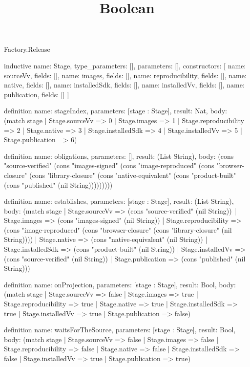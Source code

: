 \begin{lexlean}{Factory.Release}
\title{Boolean}
\begin{semanticmodule}
inductive{
  name: Stage,
  type_parameters: [],
  parameters: [],
  constructors: [
    {name: sourceVv, fields: []},
    {name: images, fields: []},
    {name: reproducibility, fields: []},
    {name: native, fields: []},
    {name: installedSdk, fields: []},
    {name: installedVv, fields: []},
    {name: publication, fields: []}
  ]
}

definition{
  name: stageIndex,
  parameters: [stage : Stage],
  result: Nat,
  body: (match stage
    | Stage.sourceVv => 0
    | Stage.images => 1
    | Stage.reproducibility => 2
    | Stage.native => 3
    | Stage.installedSdk => 4
    | Stage.installedVv => 5
    | Stage.publication => 6)
}

definition{
  name: obligations,
  parameters: [],
  result: (List String),
  body: (cons "source-verified" (cons "images-signed" (cons "image-reproduced" (cons "browser-closure" (cons "library-closure" (cons "native-equivalent" (cons "product-built" (cons "published" (nil String)))))))))
}

definition{
  name: establishes,
  parameters: [stage : Stage],
  result: (List String),
  body: (match stage
    | Stage.sourceVv => (cons "source-verified" (nil String))
    | Stage.images => (cons "images-signed" (nil String))
    | Stage.reproducibility => (cons "image-reproduced" (cons "browser-closure" (cons "library-closure" (nil String))))
    | Stage.native => (cons "native-equivalent" (nil String))
    | Stage.installedSdk => (cons "product-built" (nil String))
    | Stage.installedVv => (cons "source-verified" (nil String))
    | Stage.publication => (cons "published" (nil String)))
}

definition{
  name: onProjection,
  parameters: [stage : Stage],
  result: Bool,
  body: (match stage
    | Stage.sourceVv => false
    | Stage.images => true
    | Stage.reproducibility => true
    | Stage.native => true
    | Stage.installedSdk => true
    | Stage.installedVv => true
    | Stage.publication => false)
}

definition{
  name: waitsForTheSource,
  parameters: [stage : Stage],
  result: Bool,
  body: (match stage
    | Stage.sourceVv => false
    | Stage.images => false
    | Stage.reproducibility => false
    | Stage.native => false
    | Stage.installedSdk => false
    | Stage.installedVv => true
    | Stage.publication => true)
}


\end{semanticmodule}
\end{lexlean}
